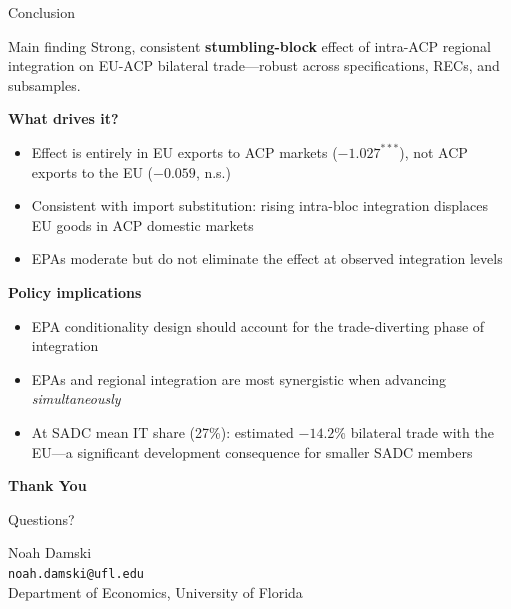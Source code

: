 \documentclass[aspectratio=169,11pt]{beamer}
\begin{document}
\begin{frame}{Conclusion}

    \begin{block}{Main finding}
        Strong, consistent \textbf{stumbling-block} effect of intra-ACP regional integration
        on EU-ACP bilateral trade---robust across specifications, RECs, and subsamples.
    \end{block}

    \medskip

    \textbf{What drives it?}
    \begin{itemize}
        \item Effect is entirely in EU exports to ACP markets ($-1.027^{***}$), not
              ACP exports to the EU ($-0.059$, n.s.)
        \item Consistent with import substitution: rising intra-bloc integration displaces
              EU goods in ACP domestic markets
        \item EPAs moderate but do not eliminate the effect at observed integration levels
    \end{itemize}

    \medskip

    \textbf{Policy implications}
    \begin{itemize}
        \item EPA conditionality design should account for the trade-diverting phase of integration
        \item EPAs and regional integration are most synergistic when advancing \emph{simultaneously}
        \item At SADC mean IT share (27\%): estimated $-14.2\%$ bilateral trade with the
              EU---a significant development consequence for smaller SADC members
    \end{itemize}

\end{frame}

\begin{frame}
    \begin{center}
        {\Huge\textbf{Thank You}}

        \vspace{0.8cm}

        {\Large Questions?}

        \vspace{0.8cm}

        Noah Damski\\[4pt]
        \texttt{noah.damski@ufl.edu}\\[6pt]
        Department of Economics, University of Florida
    \end{center}
\end{frame}
\end{document}

